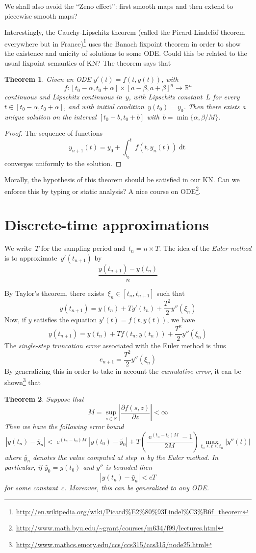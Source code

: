 \documentclass{article}
\newtheorem{theorem}{Theorem}
\newcommand{\ce}{\mathop{\mathrm{e}}}
\newcommand{\dd}[1]{\mathop{\mathrm{d}#1}}
\newcommand{\R}{\mathbb{R}}
\begin{document}
We shall also avoid the ``Zeno effect'': first smooth maps and then extend to
piecewise smooth maps?

Interestingly, the Cauchy-Lipschitz theorem (called the Picard-Lindelöf theorem
everywhere but in
France)\footnote{\url{http://en.wikipedia.org/wiki/Picard\%E2\%80\%93Lindel\%C3\%B6f_theorem}}
uses the Banach fixpoint theorem in order to show the existence and unicity of
solutions to some ODE. Could this be related to the usual fixpoint semantics
of KN? The theorem says that

\begin{theorem}
  Given an ODE $y'(t)=f(t,y(t))$, with
  \[
  f:[t_0-\alpha,t_0+\alpha]\times[a-\beta,a+\beta]^n\to\R^n
  \]
  continuous and Lipschitz continuous in~$y$, with Lipschitz constant~$L$ for
  every \hbox{$t\in[t_0-\alpha,t_0+\alpha]$}, and with initial
  condition~$y(t_0)=y_0$.  Then there exists a unique solution on the interval
  $[t_0-b,t_0+b]$ with~$b=\min\{\alpha,\beta/M\}$.
\end{theorem}
\begin{proof}
  The sequence of functions
  \[
  y_{n+1}(t)=y_0+\int_{t_0}^tf(t,y_n(t))\dd t
  \]
  converges uniformly to the solution.
\end{proof}

Morally, the hypothesis of this theorem should be satisfied in our KN. Can we
enforce this by typing or static analysis? A nice course on
ODE\footnote{\url{http://www.math.byu.edu/~grant/courses/m634/f99/lectures.html}}.

\section{Discrete-time approximations}
We write~$T$ for the sampling period and~$t_n=n\times T$. The idea of the
\emph{Euler method} is to approximate~$y'(t_{n+1})$ by
\[
\frac{y(t_{n+1})-y(t_n)}n
\]

By Taylor's theorem, there exists~$\xi_n\in[t_n,t_{n+1}]$ such that
\[
y(t_{n+1})=y(t_n)+Ty'(t_n)+\frac{T^2}2 y''(\xi_n)
\]
Now, if $y$ satisfies the equation $y'(t)=f(t,y(t))$, we have
\[
y(t_{n+1})=y(t_n)+Tf(t_n,y(t_n))+\frac{T^2}2 y''(\xi_n)
\]
The \emph{single-step truncation error} associated with the Euler method is thus
\[
e_{n+1}=\frac{T^2}2 y''(\xi_n)
\]
By generalizing this in order to take in account the \emph{cumulative error}, it
can be
shown\footnote{\url{http://www.mathcs.emory.edu/ccs/ccs315/ccs315/node25.html}}
that

\begin{theorem}
  Suppose that
  \[
  M=\sup_{s\in\R}\left|\frac{\partial f(s,z)}{\partial z}\right|<\infty
  \]
  Then we have the following error bound
  \[
  |y(t_n)-\tilde{y_n}|<\ce^{(t_n-t_0)M}|y(t_0)-\tilde{y_0}|+T\left(\frac{\ce^{(t_n-t_0)M}-1}{2M}\right)\max_{t_0\leq t\leq t_n}|y''(t)|
  \]
  where $\tilde{y_n}$ denotes the value computed at step~$n$ by the Euler
  method. In particular, if $\tilde{y_0}=y(t_0)$ and $y''$ is bounded then
  \[
  |y(t_n)-\tilde{y_n}|<cT
  \]
  for some constant~$c$. Moreover, this can be generalized to any ODE.
\end{theorem}
\end{document}
